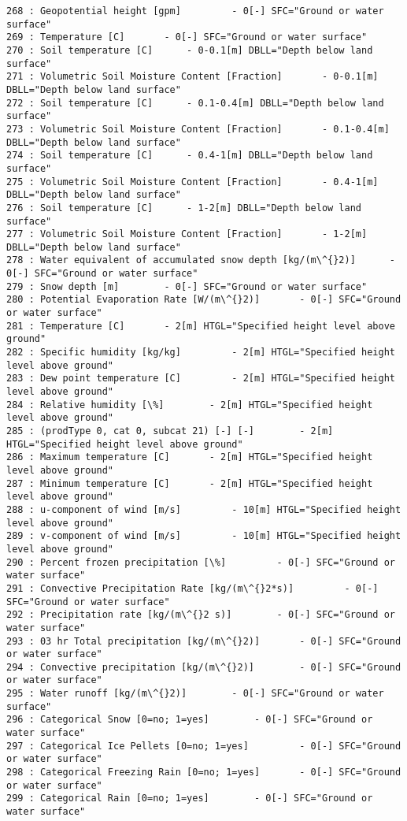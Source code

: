 \documentclass[11pt]{article}
\begin{document}
\begin{Verbatim}[commandchars=\\\{\}]
268 : Geopotential height [gpm] 		- 0[-] SFC="Ground or water surface"
269 : Temperature [C] 		- 0[-] SFC="Ground or water surface"
270 : Soil temperature [C] 		- 0-0.1[m] DBLL="Depth below land surface"
271 : Volumetric Soil Moisture Content [Fraction] 		- 0-0.1[m] DBLL="Depth below land surface"
272 : Soil temperature [C] 		- 0.1-0.4[m] DBLL="Depth below land surface"
273 : Volumetric Soil Moisture Content [Fraction] 		- 0.1-0.4[m] DBLL="Depth below land surface"
274 : Soil temperature [C] 		- 0.4-1[m] DBLL="Depth below land surface"
275 : Volumetric Soil Moisture Content [Fraction] 		- 0.4-1[m] DBLL="Depth below land surface"
276 : Soil temperature [C] 		- 1-2[m] DBLL="Depth below land surface"
277 : Volumetric Soil Moisture Content [Fraction] 		- 1-2[m] DBLL="Depth below land surface"
278 : Water equivalent of accumulated snow depth [kg/(m\^{}2)] 		- 0[-] SFC="Ground or water surface"
279 : Snow depth [m] 		- 0[-] SFC="Ground or water surface"
280 : Potential Evaporation Rate [W/(m\^{}2)] 		- 0[-] SFC="Ground or water surface"
281 : Temperature [C] 		- 2[m] HTGL="Specified height level above ground"
282 : Specific humidity [kg/kg] 		- 2[m] HTGL="Specified height level above ground"
283 : Dew point temperature [C] 		- 2[m] HTGL="Specified height level above ground"
284 : Relative humidity [\%] 		- 2[m] HTGL="Specified height level above ground"
285 : (prodType 0, cat 0, subcat 21) [-] [-] 		- 2[m] HTGL="Specified height level above ground"
286 : Maximum temperature [C] 		- 2[m] HTGL="Specified height level above ground"
287 : Minimum temperature [C] 		- 2[m] HTGL="Specified height level above ground"
288 : u-component of wind [m/s] 		- 10[m] HTGL="Specified height level above ground"
289 : v-component of wind [m/s] 		- 10[m] HTGL="Specified height level above ground"
290 : Percent frozen precipitation [\%] 		- 0[-] SFC="Ground or water surface"
291 : Convective Precipitation Rate [kg/(m\^{}2*s)] 		- 0[-] SFC="Ground or water surface"
292 : Precipitation rate [kg/(m\^{}2 s)] 		- 0[-] SFC="Ground or water surface"
293 : 03 hr Total precipitation [kg/(m\^{}2)] 		- 0[-] SFC="Ground or water surface"
294 : Convective precipitation [kg/(m\^{}2)] 		- 0[-] SFC="Ground or water surface"
295 : Water runoff [kg/(m\^{}2)] 		- 0[-] SFC="Ground or water surface"
296 : Categorical Snow [0=no; 1=yes] 		- 0[-] SFC="Ground or water surface"
297 : Categorical Ice Pellets [0=no; 1=yes] 		- 0[-] SFC="Ground or water surface"
298 : Categorical Freezing Rain [0=no; 1=yes] 		- 0[-] SFC="Ground or water surface"
299 : Categorical Rain [0=no; 1=yes] 		- 0[-] SFC="Ground or water surface"

\end{Verbatim}
\end{document}
